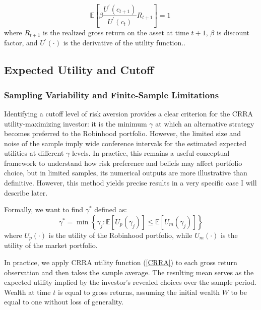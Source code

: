 \begin{equation}
    \mathbb{E}\left[ \beta \frac{U^\prime(c_{t+1})}{U^\prime(c_{t})}R_{t+1} \right] = 1\
    \label{euler_def}
\end{equation}  
where $R_{t+1}$ is the realized gross return on the asset at time $t+1$, $\beta$ is discount factor, and $U^\prime(\cdot)$ is the derivative of the utility function..


\subsection{Expected Utility and Cutoff}
\subsubsection{Sampling Variability and Finite-Sample Limitations}
Identifying a cutoff level of risk aversion provides a clear criterion for the CRRA utility-maximizing investor: 
it is the minimum $\gamma$ at which an alternative strategy becomes preferred to the Robinhood portfolio.
However, the limited size and noise of the sample imply wide conference intervals for the estimated expected utilities at different $\gamma$ levels.
In practice, this remains a useful conceptual framework to understand how risk preference and beliefs may affect portfolio choice, but in limited samples, its numerical outputs are more illustrative than definitive.
However, this method yields precise results in a very specific case I will describe later. 

Formally, we want to find $\gamma^*$ defined as:
\begin{equation}
    \gamma^* = \min\left\{ \gamma_j : \mathbb{E}[U_p(\gamma_j)] \leq \mathbb{E}[U_m(\gamma_j)] \right\}
    \label{gamma_cutoff}
\end{equation}
where $U_p(\cdot)$ is the utility of the Robinhood portfolio, while $U_m(\cdot)$ is the utility of the market portfolio.

In practice, we apply CRRA utility function (\ref{CRRA}) to each gross return observation and then takes the sample average.
The resulting mean serves as the expected utility implied by the investor's revealed choices over the sample period.
Wealth at time $t$ is equal to gross returns, assuming the initial wealth $W$ to be equal to one without loss of generality.

